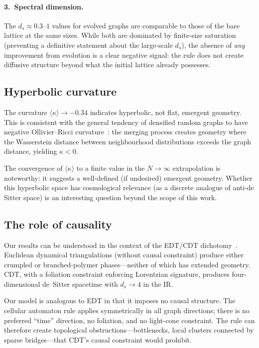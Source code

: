 \documentclass[aps,prd,twocolumn,superscriptaddress,floatfix]{revtex4-2}
\begin{document}
\paragraph{3.~Spectral dimension.}
The $d_s \approx 0.3$--$1$ values for evolved graphs are
comparable to those of the bare lattice at the same sizes.
While both are dominated by finite-size saturation (preventing
a definitive statement about the large-scale $d_s$), the
absence of \emph{any} improvement from evolution is a clear
negative signal: the rule does not create diffusive structure
beyond what the initial lattice already possesses.

\subsection{Hyperbolic curvature}

The curvature $\langle\kappa\rangle \to -0.34$ indicates
hyperbolic, not flat, emergent geometry.  This is consistent
with the general tendency of densified random graphs to have
negative Ollivier--Ricci curvature~\cite{Lin2011}: the merging
process creates geometry where the Wasserstein distance between
neighbourhood distributions exceeds the graph distance, yielding
$\kappa < 0$.

The convergence of $\langle\kappa\rangle$ to a finite value
in the $N \to \infty$ extrapolation is noteworthy: it suggests
a well-defined (if undesired) emergent geometry.  Whether this
hyperbolic space has cosmological relevance (as a discrete
analogue of anti-de Sitter space) is an interesting question
beyond the scope of this work.

\subsection{The role of causality}
\label{sec:causality}

Our results can be understood in the context of the EDT/CDT
dichotomy~\cite{Ambjorn2004,Ambjorn2012,Loll2019}.
Euclidean dynamical triangulations (without causal constraint)
produce either crumpled or branched-polymer phases---neither
of which has extended geometry.  CDT, with a foliation constraint
enforcing Lorentzian signature, produces four-dimensional
de~Sitter spacetime with $d_s \to 4$ in the IR.

Our model is analogous to EDT in that it imposes no causal
structure.  The cellular automaton rule applies symmetrically
in all graph directions; there is no preferred ``time'' direction,
no foliation, and no light-cone constraint.  The rule can
therefore create topological obstructions---bottlenecks, local
clusters connected by sparse bridges---that CDT's causal
constraint would prohibit.
\end{document}
